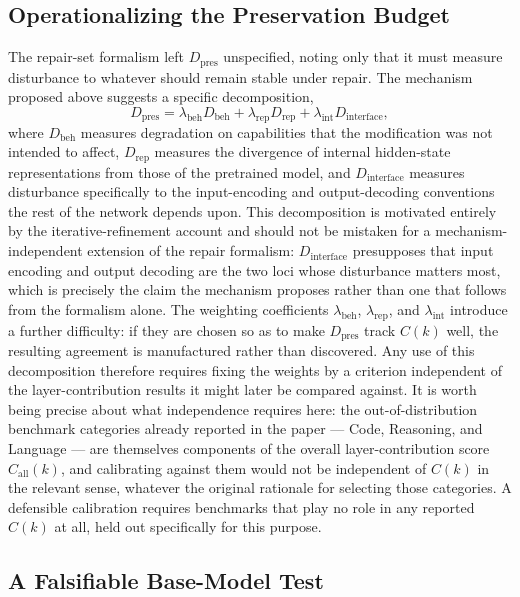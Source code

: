 \documentclass[11pt]{article}
\begin{document}
\subsection{Operationalizing the Preservation Budget}

The repair-set formalism left $D_{\mathrm{pres}}$ unspecified, noting only that it must measure disturbance to whatever should remain stable under repair. The mechanism proposed above suggests a specific decomposition,
\[
D_{\mathrm{pres}} = \lambda_{\mathrm{beh}} D_{\mathrm{beh}} + \lambda_{\mathrm{rep}} D_{\mathrm{rep}} + \lambda_{\mathrm{int}} D_{\mathrm{interface}},
\]
where $D_{\mathrm{beh}}$ measures degradation on capabilities that the modification was not intended to affect, $D_{\mathrm{rep}}$ measures the divergence of internal hidden-state representations from those of the pretrained model, and $D_{\mathrm{interface}}$ measures disturbance specifically to the input-encoding and output-decoding conventions the rest of the network depends upon. This decomposition is motivated entirely by the iterative-refinement account and should not be mistaken for a mechanism-independent extension of the repair formalism: $D_{\mathrm{interface}}$ presupposes that input encoding and output decoding are the two loci whose disturbance matters most, which is precisely the claim the mechanism proposes rather than one that follows from the formalism alone. The weighting coefficients $\lambda_{\mathrm{beh}}$, $\lambda_{\mathrm{rep}}$, and $\lambda_{\mathrm{int}}$ introduce a further difficulty: if they are chosen so as to make $D_{\mathrm{pres}}$ track $C(k)$ well, the resulting agreement is manufactured rather than discovered. Any use of this decomposition therefore requires fixing the weights by a criterion independent of the layer-contribution results it might later be compared against. It is worth being precise about what independence requires here: the out-of-distribution benchmark categories already reported in the paper --- Code, Reasoning, and Language --- are themselves components of the overall layer-contribution score $C_{\mathrm{all}}(k)$, and calibrating against them would not be independent of $C(k)$ in the relevant sense, whatever the original rationale for selecting those categories. A defensible calibration requires benchmarks that play no role in any reported $C(k)$ at all, held out specifically for this purpose.

\subsection{A Falsifiable Base-Model Test}
\end{document}

